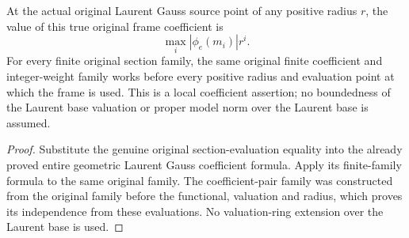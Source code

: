 \begin{theorem}\label{thm:fc-point-laurent-line-gauss}
\leanok
{}
At the actual original Laurent Gauss source point of any positive
radius $r$, the value of this true original frame coefficient is
\[
 \max_i |\phi_e(m_i)|r^i.
\]
For every finite original section family, the same original finite
coefficient and integer-weight family works before every positive
radius and evaluation point at which the frame is used. This is a
local coefficient assertion; no boundedness of the Laurent base
valuation or proper model norm over the Laurent base is assumed.
\end{theorem}
\begin{proof}
Substitute the genuine original section-evaluation equality into the
already proved entire geometric Laurent Gauss coefficient formula.
Apply its finite-family formula to the same original family. The
coefficient-pair family was constructed from the original family
before the functional, valuation and radius, which proves its
independence from these evaluations. No valuation-ring extension
over the Laurent base is used.
\end{proof}
